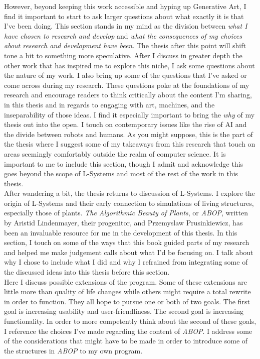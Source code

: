\documentclass[12pt,twoside]{reedthesis}
\begin{document}
	However, beyond keeping this work accessible and hyping up Generative Art, I find it important to start to ask larger questions about what exactly it is that I've been doing. This section stands in my mind as the division between \textit{what I have chosen to research and develop} and \textit{what the consequences of my choices about research and development have been}. The thesis after this point will shift tone a bit to something more speculative. After I discuss in greater depth the other work that has inspired me to explore this niche, I ask some questions about the nature of my work. I also bring up some of the questions that I've asked or come across during my research. These questions poke at the foundations of my research and encourage readers to think critically about the content I'm sharing, in this thesis and in regards to engaging with art, machines, and the inseparability of those ideas. I find it especially important to bring the \textit{why} of my thesis out into the open. I touch on contemporary issues like the rise of AI and the divide between robots and humans. As you might suppose, this is the part of the thesis where I suggest some of my takeaways from this research that touch on areas seemingly comfortably outside the realm of computer science. It is important to me to include this section, though I admit and acknowledge this goes beyond the scope of L-Systems and most of the rest of the work in this thesis.\\
	
	After wandering a bit, the thesis returns to discussion of L-Systems. I explore the origin of L-Systems and their early connection to simulations of living structures, especially those of plants. \textit{The Algorithmic Beauty of Plants}, or \textit{ABOP}, written by Aristid Lindenmayer, their progenitor, and Przemyslaw Prusinkiewicz, has been an invaluable resource for me in the development of this thesis. In this section, I touch on some of the ways that this book guided parts of my research and helped me make judgement calls about what I'd be focusing on. I talk about why I chose to include what I did and why I refrained from integrating some of the discussed ideas into this thesis before this section.\\
	
	Here I discuss possible extensions of the program. Some of these extensions are little more than quality of life changes while others might require a total rewrite in order to function. They all hope to pursue one or both of two goals. The first goal is increasing usability and user-friendliness. The second goal is increasing functionality. In order to more competently think about the second of these goals, I reference the choices I've made regarding the content of \textit{ABOP}. I address some of the considerations that might have to be made in order to introduce some of the structures in \textit{ABOP} to my own program.\\
	
\end{document}
